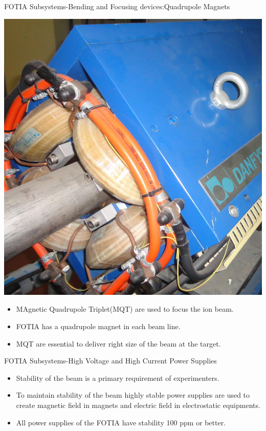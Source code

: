 \documentclass[11pt]{beamer}
\begin{document}
\begin{frame}{FOTIA Subsystems-Bending and Focusing devices:Quadrupole Magnets}

   \begin{center}
    \includegraphics[scale=0.07]{mqt.jpg}
   \end{center}
 
  \begin{itemize}
 
    \item MAgnetic Quadrupole Triplet(MQT) are used to focus the ion beam. 
    \item FOTIA has a quadrupole magnet in each beam line.  
    \item MQT are essential to deliver right size of the beam at the target. 
      
   \end{itemize}

\end{frame}



\begin{frame}{FOTIA Subsystems-High Voltage and High Current Power Supplies}

  \begin{itemize}
      
    \item Stability of the beam is a primary requirement of experimenters.
    \item To maintain stability of the beam highly stable power supplies are used to create magnetic field in magnets and electric field in electrostatic equipments. 
    \item All power supplies of the FOTIA have stability 100 ppm or better.
           
   \end{itemize}

\end{frame}
\end{document}

